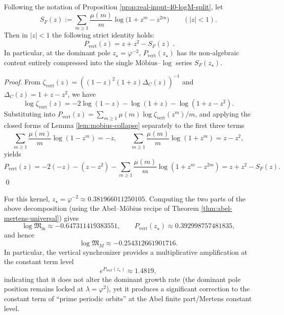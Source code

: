 \begin{corollary}\label{cor:real-input-40-vert-single-series}
Following the notation of Proposition \ref{prop:real-input-40-logM-split}, let
\[
S_F(z):=\sum_{m\ge 1}\frac{\mu(m)}{m}\log\bigl(1+z^m-z^{2m}\bigr)\qquad(|z|<1).
\]
Then in \(|z|<1\) the following strict identity holds:
\[
\boxed{\;
P_{\mathrm{vert}}(z)=z+z^2-S_F(z)\; }.
\]
In particular, at the dominant pole \(z_\star=\varphi^{-2}\),
\(
P_{\mathrm{vert}}(z_\star)
\)
has its non-algebraic content entirely compressed into the single M\"obius--$\log$ series \(S_F(z_\star)\).
\end{corollary}
\begin{proof}
From \(\zeta_{\mathrm{vert}}(z)=((1-z)^2(1+z)\Delta_C(z))^{-1}\) and \(\Delta_C(z)=1+z-z^2\), we have
\[
\log \zeta_{\mathrm{vert}}(z)
=-2\log(1-z)-\log(1+z)-\log(1+z-z^2).
\]
Substituting into
\(
P_{\mathrm{vert}}(z)=\sum_{m\ge 1}\mu(m)\log\zeta_{\mathrm{vert}}(z^m)/m
\), and applying the closed forms of Lemma \ref{lem:mobius-collapse} separately to the first three terms
\[
\sum_{m\ge 1}\frac{\mu(m)}{m}\log(1-z^m)=-z,\qquad
\sum_{m\ge 1}\frac{\mu(m)}{m}\log(1+z^m)=z-z^2,
\]
yields
\[
P_{\mathrm{vert}}(z)
=-2(-z)-(z-z^2)-\sum_{m\ge 1}\frac{\mu(m)}{m}\log(1+z^m-z^{2m})
=z+z^2-S_F(z).
\]
\qed
\end{proof}



\begin{remark}\label{rem:real-input-40-logM-split-numeric}
For this kernel, $z_\star=\varphi^{-2}\approx 0.381966011250105$. Computing the two parts of the above decomposition (using the Abel--M\"obius recipe of Theorem \ref{thm:abel-mertens-universal}) gives
\[
\log\mathfrak{M}_{\mathrm{in}}\approx -0.647311419383551,
\qquad
P_{\mathrm{vert}}(z_\star)\approx 0.392998757481835,
\]
and hence
\[
\log\mathfrak{M}_M\approx -0.254312661901716.
\]
In particular, the vertical synchronizer provides a multiplicative amplification at the constant term level
\[
e^{P_{\mathrm{vert}}(z_\star)}\approx 1.4819,
\]
indicating that it does not alter the dominant growth rate (the dominant pole position remains locked at $\lambda=\varphi^2$), yet it produces a significant correction to the constant term of ``prime periodic orbits'' at the Abel finite part/Mertens constant level.
\end{remark}

